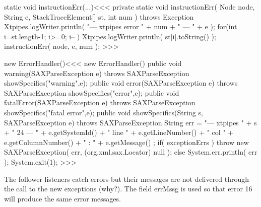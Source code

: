 \documentclass{article}
\begin{document}
\<static void instructionErr(...)\><<<
private static void instructionErr( Node node, String e,
                                StackTraceElement[] st, int num )
                                     throws Exception {
   Xtpipes.logWriter.println(
      "--- xtpipes error " + num + " --- " + e
   );
   for(int i=st.length-1; i>=0; i-- ){
      Xtpipes.logWriter.println( st[i].toString() );
   }
   instructionErr( node, e, num );
}
>>>




\<new ErrorHandler()\><<<
new ErrorHandler() {
    public void warning(SAXParseException e) throws SAXParseException {
      showSpecifics("warning",e);
    }
    public void error(SAXParseException e) throws SAXParseException {
      showSpecifics("error",e);
    }
    public void fatalError(SAXParseException e) throws SAXParseException {
      showSpecifics("fatal error",e);
    }
    public void showSpecifics(String s, SAXParseException e)
                                                throws SAXParseException {
      String err =   "--- xtpipes " + s + " 24 --- " + e.getSystemId()
                     + " line " + e.getLineNumber()
                     + " col "  + e.getColumnNumber()
                     + " : "    + e.getMessage() ;
      if( exceptionErrs ) { throw new SAXParseException(
                                     err, (org.xml.sax.Locator) null ); }
      else {
         System.err.println( err );
         System.exit(1);
}   } }
>>>





The follower listeners catch errors but their messages are not
delivered through the call to the new exceptions (why?).  The field
errMssg is used so that error 16 will produce the same error messages.
\end{document}
